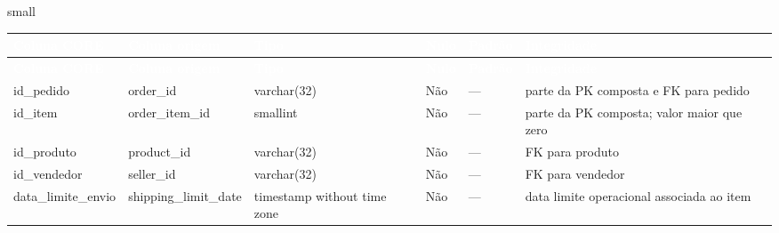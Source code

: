 \documentclass[12pt,a4paper]{article}
\begin{document}
		{small
			\renewcommand{\arraystretch}{1.18}
			
			\begin{longtable}{
					|>{\raggedright\arraybackslash}p{3cm}|
					>{\raggedright\arraybackslash}p{3.2cm}|
					>{\raggedright\arraybackslash}p{2.2cm}|
					>{\centering\arraybackslash}p{1cm}|
					>{\raggedright\arraybackslash}p{1.2cm}|
					>{\raggedright\arraybackslash}p{2.7cm}|
				}
				
				\hline
				\rowcolor{AzulCorporativo}
				
				\textcolor{white}{\textbf{Coluna CORE}} &
				\textcolor{white}{\textbf{Coluna origem}} &
				\textcolor{white}{\textbf{Tipo}} &
				\textcolor{white}{\textbf{Nulo}} &
				\textcolor{white}{\textbf{Padrão}} &
				\textcolor{white}{\textbf{Integridade}}
				\\ \hline
				
				\endfirsthead
				
				\hline
				\rowcolor{AzulCorporativo}
				
				\textcolor{white}{\textbf{Coluna CORE}} &
				\textcolor{white}{\textbf{Coluna origem}} &
				\textcolor{white}{\textbf{Tipo}} &
				\textcolor{white}{\textbf{Nulo}} &
				\textcolor{white}{\textbf{Padrão}} &
				\textcolor{white}{\textbf{Integridade}}
				\\ \hline
				
				\endhead
				
				id\_pedido
				&
				order\_id
				&
				varchar(32)
				&
				Não
				&
				---
				&
				parte da PK composta e FK para pedido
				\\ \hline
				
				id\_item
				&
				order\_item\_id
				&
				smallint
				&
				Não
				&
				---
				&
				parte da PK composta; valor maior que zero
				\\ \hline
				
				id\_produto
				&
				product\_id
				&
				varchar(32)
				&
				Não
				&
				---
				&
				FK para produto
				\\ \hline
				
				id\_vendedor
				&
				seller\_id
				&
				varchar(32)
				&
				Não
				&
				---
				&
				FK para vendedor
				\\ \hline
				
				data\_limite\_envio
				&
				shipping\_limit\_date
				&
				timestamp without time zone
				&
				Não
				&
				---
				&
				data limite operacional associada ao item
				\\ \hline
				

\end{longtable}}
\end{document}
